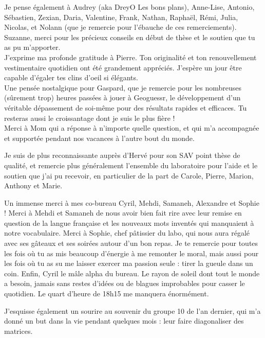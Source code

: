 Je pense également à Audrey (aka DreyO Les bons plans), Anne-Lise, Antonio, Sébastien, Zexian, Daria, Valentine, Frank, Nathan, Raphaël, Rémi, Julia, Nicolas, et Nolann (que je remercie pour l'ébauche de ces remerciements).\\
Suzanne, merci pour les précieux conseils en début de thèse et le soutien que tu as pu m’apporter. \\
J'exprime ma profonde gratitude à Pierre. Ton originalité et ton renouvellement vestimentaire quotidien ont été grandement appréciés. J’espère un jour être capable d'égaler tes clins d’oeil si élégants. \\
Une pensée nostalgique pour Gaspard, que je remercie pour les nombreuses (sûrement trop) heures passées à jouer à Geoguessr, le développement d’un véritable dépassement de soi-même pour des résultats rapides et efficaces. Tu resteras aussi le croissantage dont je suis le plus fière ! \\
Merci à Mom qui a réponse à n'importe quelle question, et qui m'a accompagnée et supportée pendant nos vacances à l'autre bout du monde.

Je suis de plus reconnaissante auprès d’Hervé pour son SAV point thèse de qualité, et remercie plus généralement l’ensemble du laboratoire pour l’aide et le soutien que j’ai pu recevoir, en particulier de la part de Carole, Pierre, Marion, Anthony et Marie. 

Un immense merci à mes co-bureau Cyril, Mehdi, Samaneh, Alexandre et Sophie ! Merci à Mehdi et Samaneh de nous avoir bien fait rire avec leur remise en question de la langue française et les nouveaux mots inventés qui manquaient à notre vocabulaire. Merci à Sophie, chef pâtissier du labo, qui nous aura régalé avec ses gâteaux et ses soirées autour d’un bon repas. Je te remercie pour toutes les fois où tu as mis beaucoup d’énergie à me remonter le moral, mais aussi pour les fois où tu as su me laisser exercer ma passion seule : tirer la gueule dans un coin. Enfin, Cyril le mâle alpha du bureau. Le rayon de soleil dont tout le monde a besoin, jamais sans restes d’idées ou de blagues improbables pour casser le quotidien. Le quart d’heure de 18h15 me manquera énormément.

J'esquisse également un sourire au souvenir du groupe 10 de l'an dernier, qui m'a donné un but dans la vie pendant quelques mois : leur faire diagonaliser des matrices. 

